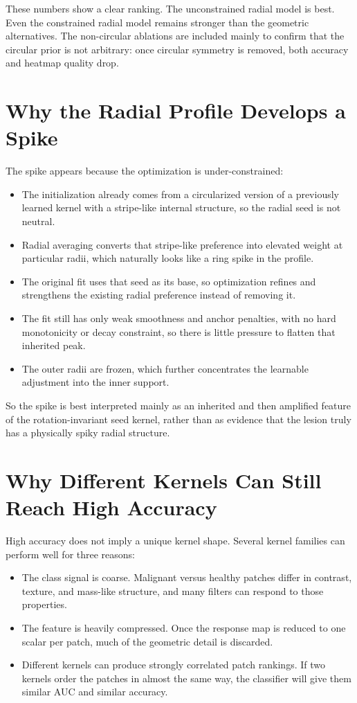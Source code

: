\documentclass{article}
\begin{document}
These numbers show a clear ranking. The unconstrained radial model is best. Even the constrained radial model remains stronger than the geometric alternatives. The non-circular ablations are included mainly to confirm that the circular prior is not arbitrary: once circular symmetry is removed, both accuracy and heatmap quality drop.

\section*{Why the Radial Profile Develops a Spike}

The spike appears because the optimization is under-constrained:

\begin{itemize}
    \item The initialization already comes from a circularized version of a previously learned kernel with a stripe-like internal structure, so the radial seed is not neutral.
    \item Radial averaging converts that stripe-like preference into elevated weight at particular radii, which naturally looks like a ring spike in the profile.
    \item The original fit uses that seed as its base, so optimization refines and strengthens the existing radial preference instead of removing it.
    \item The fit still has only weak smoothness and anchor penalties, with no hard monotonicity or decay constraint, so there is little pressure to flatten that inherited peak.
    \item The outer radii are frozen, which further concentrates the learnable adjustment into the inner support.
\end{itemize}

So the spike is best interpreted mainly as an inherited and then amplified feature of the rotation-invariant seed kernel, rather than as evidence that the lesion truly has a physically spiky radial structure.

\section*{Why Different Kernels Can Still Reach High Accuracy}

High accuracy does not imply a unique kernel shape. Several kernel families can perform well for three reasons:

\begin{itemize}
    \item The class signal is coarse. Malignant versus healthy patches differ in contrast, texture, and mass-like structure, and many filters can respond to those properties.
    \item The feature is heavily compressed. Once the response map is reduced to one scalar per patch, much of the geometric detail is discarded.
    \item Different kernels can produce strongly correlated patch rankings. If two kernels order the patches in almost the same way, the classifier will give them similar AUC and similar accuracy.
\end{itemize}
\end{document}
